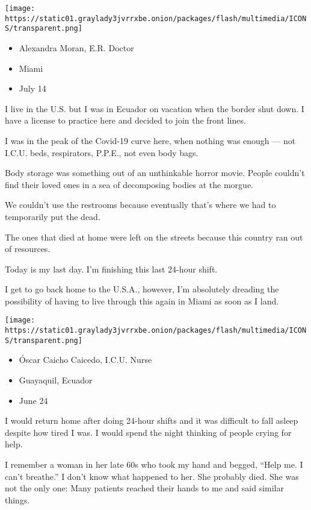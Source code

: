 \texttt{[image: https://static01.graylady3jvrrxbe.onion/packages/flash/multimedia/ICONS/transparent.png]}

\begin{itemize}
\tightlist
\item
  Alexandra Moran, E.R. Doctor
\item
  Miami
\item
  July 14
\end{itemize}

I live in the U.S. but I was in Ecuador on vacation when the border shut
down. I have a license to practice here and decided to join the front
lines.

I was in the peak of the Covid-19 curve here, when nothing was enough
--- not I.C.U. beds, respirators, P.P.E., not even body bags.

Body storage was something out of an unthinkable horror movie. People
couldn't find their loved ones in a sea of decomposing bodies at the
morgue.

We couldn't use the restrooms because eventually that's where we had to
temporarily put the dead.

The ones that died at home were left on the streets because this country
ran out of resources.

Today is my last day. I'm finishing this last 24-hour shift.

I get to go back home to the U.S.A., however, I'm absolutely dreading
the possibility of having to live through this again in Miami as soon as
I land.

\texttt{[image: https://static01.graylady3jvrrxbe.onion/packages/flash/multimedia/ICONS/transparent.png]}

\begin{itemize}
\tightlist
\item
  Óscar Caicho Caicedo, I.C.U. Nurse
\item
  Guayaquil, Ecuador
\item
  June 24
\end{itemize}

I would return home after doing 24-hour shifts and it was difficult to
fall asleep despite how tired I was. I would spend the night thinking of
people crying for help.

I remember a woman in her late 60s who took my hand and begged, ``Help
me. I can't breathe.'' I don't know what happened to her. She probably
died. She was not the only one: Many patients reached their hands to me
and said similar things.

